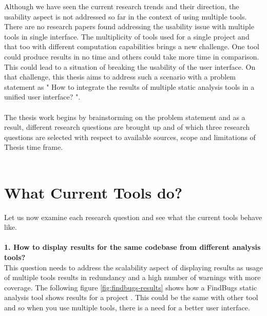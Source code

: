 Although we have seen the current research trends and their direction, the usability aspect is not addressed so far in the context of using multiple tools. There are no research papers found addressing the usability issue with multiple tools in single interface. The multiplicity of tools used for a single project and that too with different computation capabilities brings a new challenge.  One tool could produce results in no time and others could take more time in comparison. This could lead to a situation of breaking the usability of the user interface. On that challenge, this thesis aims to address such a scenario with a problem statement as " How to integrate the results of multiple static analysis tools in a unified user interface? ".  \\ \\

The thesis work begins by brainstorming on the problem statement and as a result, different research questions are brought up and of which three research questions are selected with respect to available sources, scope and limitations of Thesis time frame. \\ \\

\section{What Current Tools do?}

Let us now examine each research question and see what the current tools behave like. \\ \\

\textbf{1. How to display results for the same codebase from different analysis tools?}  \\

This question needs to address the scalability aspect of displaying results as usage of multiple tools results in redundancy and a high number of warnings with more coverage. The following figure \ref{fig:findbugs-results} shows how a FindBugs \cite{findbugs} static analysis tool shows results for a project \cite{findbugs-example}. This could be the same with other tool and so when you use multiple tools, there is a need for a better user interface.\\ \\

